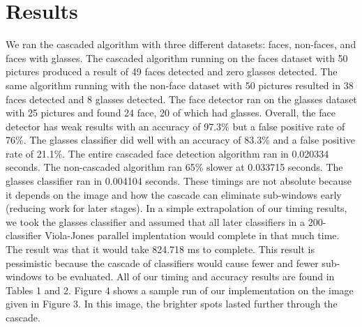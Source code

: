 \documentclass[12pt] {article}
\begin{document}
\section{Results}
We ran the cascaded algorithm with three different datasets: faces, non-faces, and faces with glasses. The cascaded algorithm running on the faces dataset with 50 pictures produced a result of 49 faces detected and zero glasses detected. The same algorithm running with the non-face dataset with 50 pictures resulted in 38 faces detected and 8 glasses detected. The face detector ran on the glasses dataset with 25 pictures and found 24 face, 20 of which had glasses. Overall, the face detector has weak results with an accuracy of 97.3\% but a false positive rate of 76\%. The glasses classifier did well with an accuracy of 83.3\% and a false positive rate of 21.1\%. The entire cascaded face detection algorithm ran in 0.020334 seconds. The non-cascaded algorithm ran 65\% slower at 0.033715 seconds. The glasses classifier ran in 0.004104 seconds. These timings are not absolute because it depends on the image and how the cascade can eliminate sub-windows early (reducing work for later stages). In a simple extrapolation of our timing results, we took the glasses classifier and assumed that all later classifiers in a 200-classifier Viola-Jones parallel implentation would complete in that much time. The result was that it would take 824.718 ms to complete. This result is pessimistic because the cascade of classifiers would cause fewer and fewer sub-windows to be evaluated. All of our timing and accuracy results are found in Tables 1 and 2. Figure 4 shows a sample run of our implementation on the image given in Figure 3. In this image, the brighter spots lasted further through the cascade.
\end{document}
